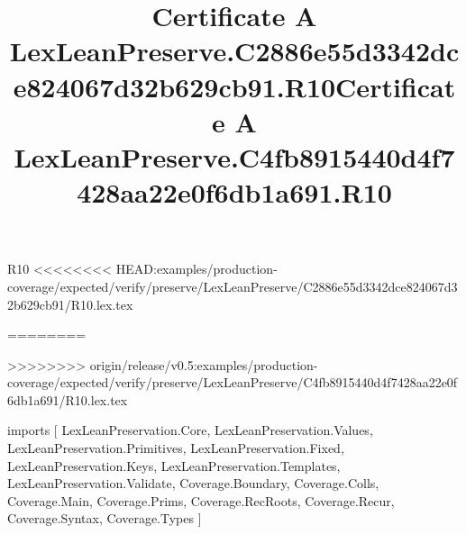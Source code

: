 \begin{lexlean}{R10}
<<<<<<<< HEAD:examples/production-coverage/expected/verify/preserve/LexLeanPreserve/C2886e55d3342dce824067d32b629cb91/R10.lex.tex
\title{Certificate A LexLeanPreserve.C2886e55d3342dce824067d32b629cb91.R10}
========
\title{Certificate A LexLeanPreserve.C4fb8915440d4f7428aa22e0f6db1a691.R10}
>>>>>>>> origin/release/v0.5:examples/production-coverage/expected/verify/preserve/LexLeanPreserve/C4fb8915440d4f7428aa22e0f6db1a691/R10.lex.tex
\begin{coremodule}
imports [
  LexLeanPreservation.Core,
  LexLeanPreservation.Values,
  LexLeanPreservation.Primitives,
  LexLeanPreservation.Fixed,
  LexLeanPreservation.Keys,
  LexLeanPreservation.Templates,
  LexLeanPreservation.Validate,
  Coverage.Boundary,
  Coverage.Colls,
  Coverage.Main,
  Coverage.Prims,
  Coverage.RecRoots,
  Coverage.Recur,
  Coverage.Syntax,
  Coverage.Types
]


\end{coremodule}
\end{lexlean}
